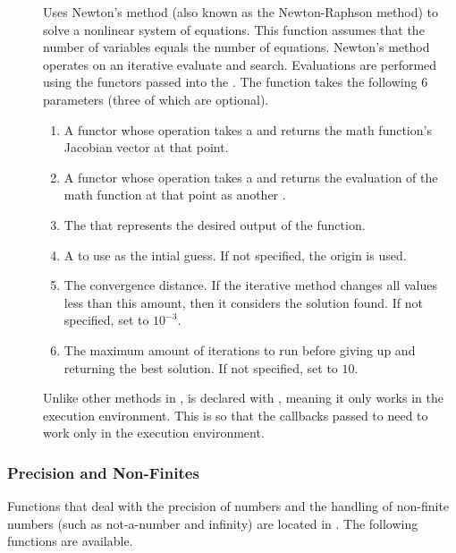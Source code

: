 \begin{description}
\item[] Uses Newton's method (also known as the
  Newton-Raphson method) to solve a nonlinear system of equations. This
  function assumes that the number of variables equals the number of
  equations. Newton's method operates on an iterative evaluate and
  search. Evaluations are performed using the functors passed into the
  . The function takes the following 6
  parameters (three of which are optional).
  \begin{enumerate}
  \item A functor whose operation takes a  and returns the
    math function's Jacobian vector at that point.
  \item A functor whose operation takes a  and returns the
    evaluation of the math function at that point as another .
  \item The  that represents the desired output of the function.
  \item A  to use as the intial guess. If not specified, the
    origin is used.
  \item The convergence distance. If the iterative method changes all
    values less than this amount, then it considers the solution found. If
    not specified, set to $10^{-3}$.
  \item The maximum amount of iterations to run before giving up and
    returning the best solution. If not specified, set to $10$.
  \end{enumerate}
  Unlike other methods in \daxmath{},  is
  declared with , meaning it only works in the
  execution environment. This is so that the callbacks passed to
   need to work only in the execution
  environment.
\end{description}

\subsubsection{Precision and Non-Finites}

Functions that deal with the precision of numbers and the handling of
non-finite numbers (such as not-a-number and infinity) are located in
. The following functions are available.

